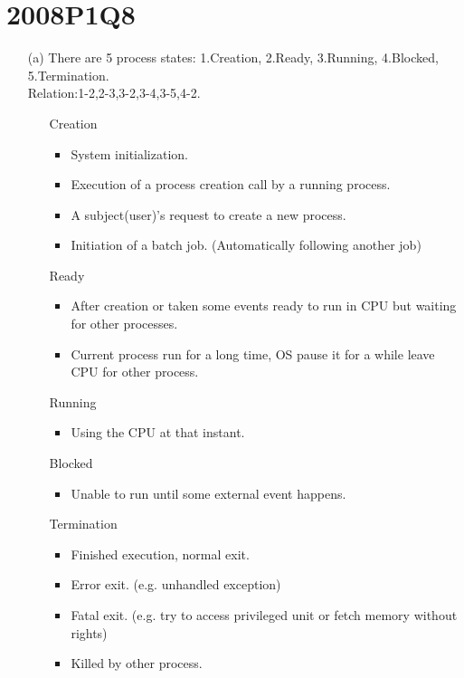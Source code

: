 \documentclass[10pt,twoside,a4paper]{article}
\begin{document}
\section{2008P1Q8}
\begin{itemize}
\item[(a)]
There are 5 process states: 1.Creation, 2.Ready, 3.Running, 4.Blocked, 5.Termination.
\\Relation:1-2,2-3,3-2,3-4,3-5,4-2.
\begin{itemize}
\item[Creation]
\begin{itemize}
\item System initialization.
\item Execution of a process creation call by a running process.
\item A subject(user)'s request to create a new process.
\item Initiation of a batch job. (Automatically following another job)
\end{itemize}
\item[Ready]
\begin{itemize}
\item After creation or taken some events ready to run in CPU but waiting for other processes.
\item Current process run for a long time, OS pause it for a while leave CPU for other process.
\end{itemize}
\item[Running]
\begin{itemize}
\item Using the CPU at that instant.
\end{itemize}
\item[Blocked]
\begin{itemize}
\item Unable to run until some external event happens.
\end{itemize}
\item[Termination]
\begin{itemize}
\item Finished execution, normal exit.
\item Error exit. (e.g. unhandled exception)
\item Fatal exit. (e.g. try to access privileged unit or fetch memory without rights)
\item Killed by other process.
\end{itemize}
\end{itemize}
\end{itemize}
\end{document}
